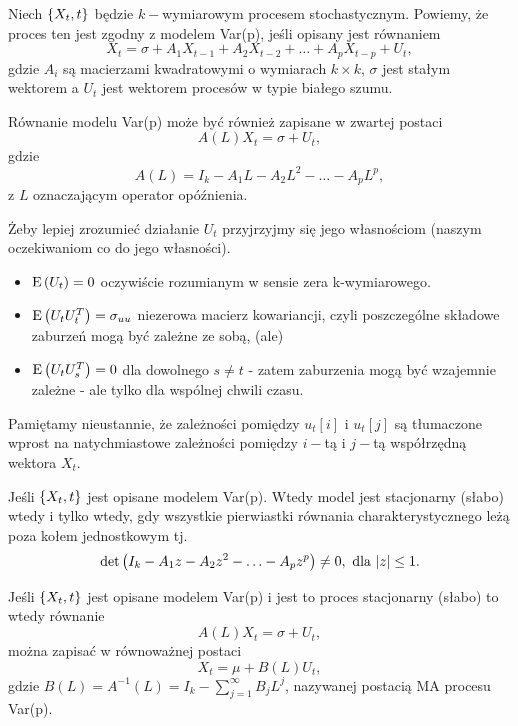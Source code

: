 \documentclass[10pt,a4paper]{book}
\begin{document}
\begin{definition} 
Niech $\left\lbrace {{X_t}, {t}} \right\rbrace$ będzie $k-$wymiarowym procesem stochastycznym. Powiemy, że proces ten jest zgodny z modelem Var(p), jeśli opisany jest równaniem
$$
X_t = \sigma + A_1 X_{t-1} + A_2 X_{t-2} + \ldots + A_p X_{t-p} + U_t,
$$
gdzie $A_i$ są macierzami kwadratowymi o wymiarach $k \times k$, $\sigma$ jest stałym wektorem a $U_t$ jest wektorem procesów w typie białego szumu. 
\end{definition}

\begin{remark}
Równanie modelu Var(p) może być również zapisane w zwartej postaci
$$
A(L) X_t = \sigma + U_t,
$$
gdzie 
$$
A(L) = I_k - A_1 L - A_2 L^2 - \ldots - A_p L^p,
$$
z $L$ oznaczającym operator opóźnienia. 
\end{remark}

\begin{remark}

Żeby lepiej zrozumieć działanie $U_t$ przyjrzyjmy się jego własnościom (naszym oczekiwaniom co do jego własności).
\begin{itemize}
\item $\operatorname{E} \left({U_t} \right) = 0$ oczywiście rozumianym w sensie zera k-wymiarowego. 
\item $\operatorname{E} \left({U_t U_t^T} \right) = \sigma_{uu}$ niezerowa macierz kowariancji, czyli poszczególne składowe zaburzeń mogą być zależne ze sobą, (ale)
\item $\operatorname{E} \left({U_t U_s^T} \right) = 0 $ dla dowolnego $s \neq t$ - zatem zaburzenia mogą być wzajemnie zależne - ale tylko dla wspólnej chwili czasu.
\end{itemize}
Pamiętamy nieustannie, że zależności pomiędzy $u_t[i]$ i $u_t[j]$ są tłumaczone wprost na natychmiastowe zależności pomiędzy $i-$tą i $j-$tą współrzędną wektora $X_t$. 
\end{remark}

\begin{theorem}
Jeśli $\left\lbrace {{X_t}, {t}} \right\rbrace$ jest opisane modelem Var(p). Wtedy model jest stacjonarny (słabo) wtedy i tylko wtedy, gdy wszystkie pierwiastki równania charakterystycznego leżą poza kołem jednostkowym tj.
$$
\det {\left( {I_k - A_1 z - A_2 z^2 - \ldots - A_p z^p} \right)} \neq 0, \text{ dla } {\left| {z} \right|} \leq 1.
$$
\end{theorem}

\begin{theorem}
Jeśli $\left\lbrace {{X_t}, {t}} \right\rbrace$ jest opisane modelem Var(p) i jest to proces stacjonarny (słabo) to wtedy równanie
$$
A(L) X_t = \sigma + U_t,
$$
można zapisać w równoważnej postaci 
$$
X_t = \mu + B(L) U_t,
$$
gdzie $B(L) = A^{-1}(L) = I_k - \sum_{j=1}^{\infty} B_j L^j$, nazywanej postacią MA procesu Var(p).
\end{theorem}
\end{document}
